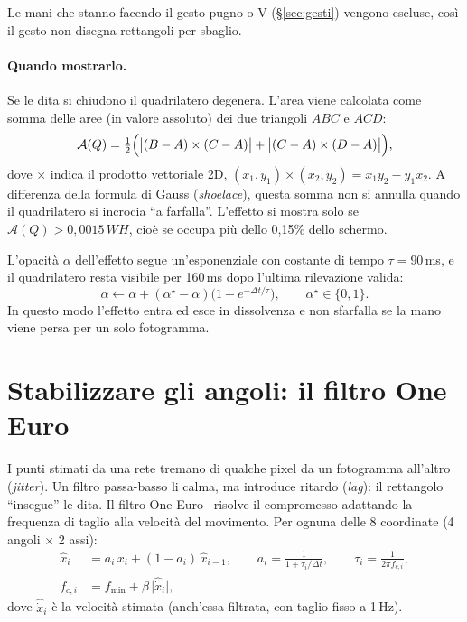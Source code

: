 \documentclass[11pt,a4paper]{article}
\begin{document}
Le mani che stanno facendo il gesto pugno o V (\S\ref{sec:gesti}) vengono escluse, così il
gesto non disegna rettangoli per sbaglio.

\paragraph{Quando mostrarlo.} Se le dita si chiudono il quadrilatero degenera. L'area viene
calcolata come somma delle aree (in valore assoluto) dei due triangoli $ABC$ e $ACD$:
\begin{equation}
  \mathcal{A}(Q)=\tfrac12\Bigl(\bigl|(B-A)\times(C-A)\bigr|+\bigl|(C-A)\times(D-A)\bigr|\Bigr),
\end{equation}
dove $\times$ indica il prodotto vettoriale 2D, $(x_1,y_1)\times(x_2,y_2)=x_1y_2-y_1x_2$. A
differenza della formula di Gauss (\emph{shoelace}), questa somma non si annulla quando il
quadrilatero si incrocia ``a farfalla''. L'effetto si mostra solo se
$\mathcal{A}(Q)>0{,}0015\,WH$, cioè se occupa più dello 0,15\% dello schermo.

L'opacità $\alpha$ dell'effetto segue un'esponenziale con costante di tempo $\tau=90$\,ms, e
il quadrilatero resta visibile per 160\,ms dopo l'ultima rilevazione valida:
\begin{equation}
  \alpha\leftarrow\alpha+(\alpha^\star-\alpha)\bigl(1-e^{-\Delta t/\tau}\bigr),\qquad
  \alpha^\star\in\{0,1\}.
\end{equation}
In questo modo l'effetto entra ed esce in dissolvenza e non sfarfalla se la mano viene persa per
un solo fotogramma.

\section{Stabilizzare gli angoli: il filtro One Euro}

I punti stimati da una rete tremano di qualche pixel da un fotogramma all'altro (\emph{jitter}).
Un filtro passa-basso li calma, ma introduce ritardo (\emph{lag}): il rettangolo ``insegue'' le
dita. Il filtro One Euro~\cite{casiez2012oneeuro} risolve il compromesso adattando la frequenza di
taglio alla velocità del movimento. Per ognuna delle 8 coordinate (4 angoli $\times$ 2 assi):
\begin{align}
  \hat{x}_i &= a_i\,x_i+(1-a_i)\,\hat{x}_{i-1},\qquad
  a_i=\frac{1}{1+\tau_i/\Delta t},\qquad \tau_i=\frac{1}{2\pi f_{c,i}},\\
  f_{c,i} &= f_{\min}+\beta\,\bigl|\hat{\dot{x}}_i\bigr|,
\end{align}
dove $\hat{\dot{x}}_i$ è la velocità stimata (anch'essa filtrata, con taglio fisso a 1\,Hz).
\end{document}
